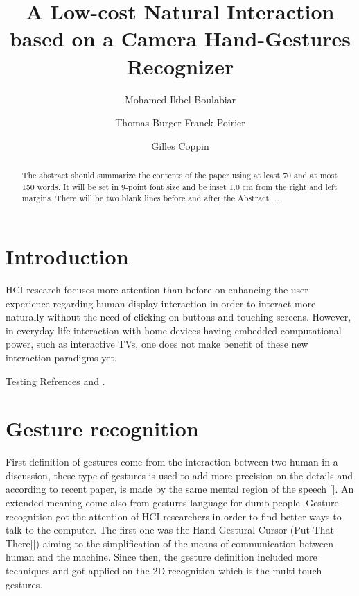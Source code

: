 \documentclass{llncs}
\begin{document}
\frontmatter          %
\pagestyle{headings}  %
\mainmatter              %
%
\title{A Low-cost Natural Interaction based on a Camera Hand-Gestures Recognizer}
\author{Mohamed-Ikbel Boulabiar \and Thomas Burger
Franck Poirier \and Gilles Coppin}
%

\maketitle

\begin{abstract}
The abstract should summarize the contents of the paper
using at least 70 and at most 150 words. It will be set in 9-point
font size and be inset 1.0 cm from the right and left margins.
There will be two blank lines before and after the Abstract. \dots
{}
\end{abstract}
%

\section{Introduction}
HCI research focuses more attention than before on enhancing the user experience regarding human-display interaction in order to interact more naturally without the need of clicking on buttons and touching screens. However, in everyday life interaction with home devices having embedded computational power, such as interactive TVs, one does not make benefit of these new interaction paradigms yet. 

Testing Refrences \cite{Gesturecraft} and \cite{skinColorSeg}.

\section{Gesture recognition}
First definition of gestures come from the interaction between two human in a discussion, these type of gestures is used to add more precision on the details and according to recent paper, is made by the same mental region of the speech []. An extended meaning come also from gestures language for dumb people.
Gesture recognition got the attention of HCI researchers in order to find better ways to talk to the computer. The first one was the Hand Gestural Cursor (Put-That-There[]) aiming to the simplification of the means of communication between human and the machine.
Since then, the gesture definition included more techniques and got applied on the 2D recognition which is the multi-touch gestures.
\end{document}
